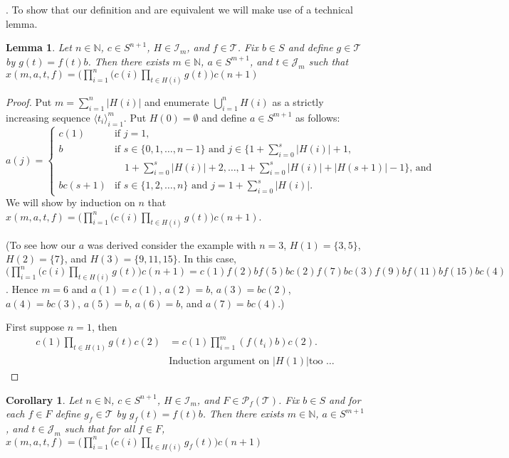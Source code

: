 \documentclass[12pt]{article}
\theoremstyle{plain}
\newtheorem{cor}[thm]{Corollary}
\newtheorem{lem}[thm]{Lemma}
\theoremstyle{definition}
\newcommand{\la}{\langle}
\newcommand{\ra}{\rangle}
\newcommand{\bbN}{\mathbb{N}}
\newcommand{\calI}{\mathcal{I}}
\newcommand{\calJ}{\mathcal{J}}
\newcommand{\calT}{\mathcal{T}}
\newcommand{\Pf}{\mathcal{P}_f}
\begin{document}
\cite[Definition 3.3(e)]{De:2008uq}. 
To show that our definition and \cite[Definition
2.3(d)]{Hindman:2010fk} are equivalent we will make use of a technical
lemma.
\begin{lem}
  Let $n \in \bbN$, $c \in S^{n+1}$, $H \in \calI_m$, and $f \in
  \calT$. 
  Fix $b \in S$ and define $g \in \calT$ by $g(t) = f(t)b$. 
  Then there exists $m \in \bbN$, $a \in S^{m+1}$, and $t \in \calJ_m$
  such that $x(m, a, t, f) = \bigl(\prod_{i=1}^n( c(i) \prod_{t \in H(i)}
  g(t)\bigr) c(n+1)$
\end{lem}
\begin{proof}
  Put $m = \sum_{i=1}^n |H(i)|$ and enumerate $\bigcup_{i=1}^n H(i)$
  as a strictly increasing sequence $\la t_i \ra_{i=1}^m$. 
  Put $H(0) = \emptyset$ and define $a \in S^{m+1}$ as follows:
  \[
    a(j) =
    \begin{cases}
      c(1) & \mbox{if $j = 1$,} \\
      b    & \mbox{if $s \in \{0, 1, \ldots, n-1\}$ and $j \in \{1 +
        \sum_{i=0}^s |H(i)| + 1,$}\\
      & \hspace{1em}\mbox{$1 + \sum_{i=0}^s |H(i)| + 2, \ldots,
        1 + \sum_{i=0}^s |H(i)| + |H(s+1)| - 1\}$, and} \\
      bc(s+1) & \mbox{if $s \in \{1, 2, \ldots, n\}$ and $j = 1 +
        \sum_{i=0}^s |H(i)|$.} 
    \end{cases}
  \]
  We will show by induction on $n$ that $x(m, a, t, f) =
  \bigl(\prod_{i=1}^n( c(i) \prod_{t \in H(i)} g(t)\bigr) c(n+1)$. 

  (To see how our $a$ was derived consider the example with $n = 3$,
  $H(1) = \{3, 5\}$, $H(2) = \{7\}$, and $H(3) = \{9, 11, 15\}$.
  In this case, $\bigl(\prod_{i=1}^n( c(i) \prod_{t \in H(i)}
  g(t)\bigr) c(n+1) =
  c(1)f(2)bf(5)bc(2)f(7)bc(3)f(9)bf(11)bf(15)bc(4)$.
  Hence $m = 6$ and $a(1) = c(1)$, $a(2) = b$, $a(3) = bc(2)$, $a(4) =
  bc(3)$, $a(5) = b$, $a(6) = b$, and $a(7) = bc(4)$.)

  First suppose $n = 1$, then
  \begin{align*}
    c(1) \prod_{t \in H(1)} g(t) c(2) &= c(1) \prod_{i=1}^m (f(t_i) b)
    c(2). \\
    &\mbox{Induction argument on $|H(1)|$
      too \ldots}
  \end{align*}
\end{proof}
\begin{cor}
  \label{cor:stJsets}
  Let $n \in \bbN$, $c \in S^{n+1}$, $H \in \calI_m$, and $F \in
  \Pf(\calT)$. 
  Fix $b \in S$ and for each $f \in F$ define $g_f \in \calT$ by
  $g_f(t) = f(t)b$. 
  Then there exists $m \in \bbN$, $a \in S^{m+1}$, and $t \in \calJ_m$
  such that for all $f \in F$, $x(m, a, t, f) = \bigl(\prod_{i=1}^n(
  c(i) \prod_{t \in H(i)} g_f(t)\bigr) c(n+1)$
\end{cor}
\end{document}
